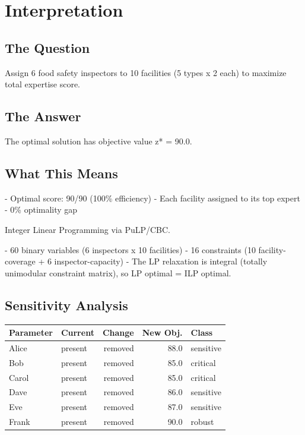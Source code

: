 \documentclass[11pt, a4paper]{article}
\begin{document}
\section{Interpretation}

\subsection{The Question}
Assign 6 food safety inspectors to 10 facilities (5 types x 2 each) to
maximize total expertise score.

\subsection{The Answer}

\begin{polyainsight}[title={Bottom Line}]
The optimal solution has objective value z* = 90.0.
\end{polyainsight}

\subsection{What This Means}

- Optimal score: 90/90 (100\% efficiency)
- Each facility assigned to its top expert
- 0\% optimality gap

Integer Linear Programming via PuLP/CBC.

- 60 binary variables (6 inspectors x 10 facilities)
- 16 constraints (10 facility-coverage + 6 inspector-capacity)
- The LP relaxation is integral (totally unimodular constraint matrix),
  so LP optimal = ILP optimal.

\subsection{Sensitivity Analysis}

\begin{longtable}{llrrl}
\toprule
\textbf{Parameter} & \textbf{Current} & \textbf{Change} & \textbf{New Obj.} & \textbf{Class} \\
\midrule
\endhead
Alice & present & removed & 88.0 &
\textcolor{polyagray}{sensitive} \\
Bob & present & removed & 85.0 &
\textcolor{polyared}{critical} \\
Carol & present & removed & 85.0 &
\textcolor{polyared}{critical} \\
Dave & present & removed & 86.0 &
\textcolor{polyagray}{sensitive} \\
Eve & present & removed & 87.0 &
\textcolor{polyagray}{sensitive} \\
Frank & present & removed & 90.0 &
\textcolor{polyagreen}{robust} \\
\bottomrule
\end{longtable}
\end{document}
